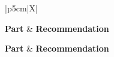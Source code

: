 \documentclass{article}
\begin{document}
\begin{onehalfspacing}
    \begin{xltabular}{\textwidth}{|p{5cm}|X|}
        
        \hline \textbf{Part} & \textbf{Recommendation} \\ \hline
        \endhead
        
        \hline \textbf{Part} & \textbf{Recommendation} \\ \hline
        \endfirsthead
        
         \\ \hline
        \endfoot
        
        \caption{Transport recommendations for the GPR-20 robot.} \label{tab:transport_recommendations}
        \endlastfoot
        

\end{xltabular}
\end{onehalfspacing}
\end{document}
